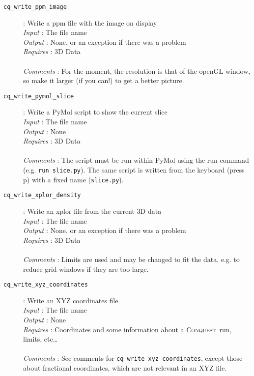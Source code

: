 \documentclass[a4paper,notitlepage,11pt]{article}
\def\CQ{\textsc{Conquest}}
\begin{document}
\begin{description}
\item[\texttt{cq\_write\_ppm\_image}]: Write a ppm file with the image on display\\
  \emph{Input} : The file name\\
  \emph{Output} : None, or an exception if there was a problem\\
  \emph{Requires} : 3D Data\\
  \\
  \emph{Comments} : For the moment, the resolution is that of the openGL window, 
  so make it larger (if you can!) to get a better picture.
\end{description}

\begin{description}
\item[\texttt{cq\_write\_pymol\_slice}]: Write a PyMol script to show the current slice\\
  \emph{Input} : The file name\\
  \emph{Output} : None\\
  \emph{Requires} : 3D Data\\
  \\
  \emph{Comments} : The script must be run within PyMol using the run command (e.g. \texttt{run slice.py}). 
  The same script is written from the keyboard (press p) with a fixed name (\texttt{slice.py}).
\end{description}

\begin{description}
\item[\texttt{cq\_write\_xplor\_density}]: Write an xplor file from the current 3D data\\
  \emph{Input} : The file name\\
  \emph{Output} : None, or an exception if there was a problem\\
  \emph{Requires} : 3D Data\\
  \\
  \emph{Comments} : Limits are used and may be changed to fit the data, e.g. to reduce grid windows if they are too large.
\end{description}

\begin{description}
\item[\texttt{cq\_write\_xyz\_coordinates}]: Write an XYZ coordinates
file\\ 
\emph{Input} : The file name\\ 
\emph{Output} : None\\
  \emph{Requires} : Coordinates and some information about a \CQ\ run, limits,
  etc\ldots\\
  \\
  \emph{Comments} : See comments for \texttt{cq\_write\_xyz\_coordinates},
  except those about fractional coordinates, which are not relevant in an XYZ
  file.
\end{description}
\end{document}
